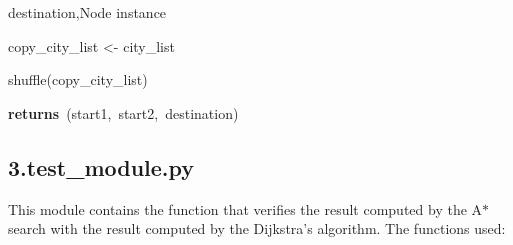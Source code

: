 \documentclass[12pt]{article}
\begin{document}
\begin{adjustwidth}{0.5in}{0.0in}
\begin{justify}
{\fontsize{8pt}{9.6pt}\selectfont  \tabto{0.75in} \tab \tab destination,Node instance\par}
\end{justify}\par

\end{adjustwidth}

\begin{adjustwidth}{0.5in}{0.0in}
\begin{justify}
{\fontsize{8pt}{9.6pt}\selectfont  \tabto{0.75in} copy\_city\_list <- city\_list\par}
\end{justify}\par

\end{adjustwidth}

\begin{adjustwidth}{0.5in}{0.0in}
\begin{justify}
{\fontsize{8pt}{9.6pt}\selectfont  \tabto{0.75in} shuffle(copy\_city\_list)\par}
\end{justify}\par

\end{adjustwidth}

\begin{adjustwidth}{0.5in}{0.0in}
\begin{justify}
 \tabto{0.75in} {\fontsize{8pt}{9.6pt}\selectfont \textbf{returns}\ (start1,\ start2,\ destination)    \par}
\end{justify}\par

\end{adjustwidth}

\subsection*{3.\hspace*{10pt}test\_module.py}
\begin{adjustwidth}{0.5in}{0.0in}
\begin{justify}
This module contains the function that verifies the result computed by the A$\ast$  search with the result computed by the Dijkstra’s algorithm. The functions used:
\end{justify}\par

\end{adjustwidth}
\end{document}
